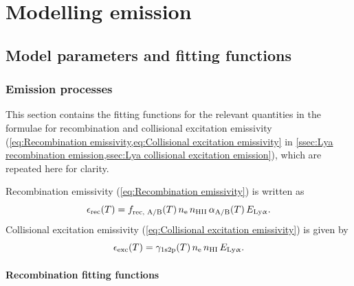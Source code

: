 \chapter{Modelling \texorpdfstring{\lymana}{\lymanatext} emission}
\label{ap:Modelling Lya emission}



\section{Model parameters and fitting functions}
\label{ap:Model parameters}

\subsection{Emission processes}

This section contains the fitting functions for the relevant quantities in the formulae for recombination and collisional excitation emissivity (\cref{eq:Recombination emissivity,eq:Collisional excitation emissivity} in \cref{ssec:Lya recombination emission,ssec:Lya collisional excitation emission}), which are repeated here for clarity.

\vspace{1.5ex} \noindent Recombination emissivity (\cref{eq:Recombination emissivity}) is written as
\begin{equation}
    \label{eq:AppRecombination emissivity}
    \epsilon_\text{rec}(T) = f_\text{rec, A/B} (T) \, n_\text{e} \, n_\text{HII} \, \alpha_\text{A/B}(T) \, E_\text{{Ly\ensuremath{\upalpha}}}
    .\end{equation}
\noindent Collisional excitation emissivity (\cref{eq:Collisional excitation emissivity}) is given by
\begin{equation}
    \label{eq:AppCollisional excitation emissivity}
    \epsilon_\text{exc}(T) = \gamma_\text{1s2p} (T) \, n_\text{e} \, n_\text{HI} \, E_\text{{Ly\ensuremath{\upalpha}}}
    .\end{equation}

\subsubsection{Recombination fitting functions}

